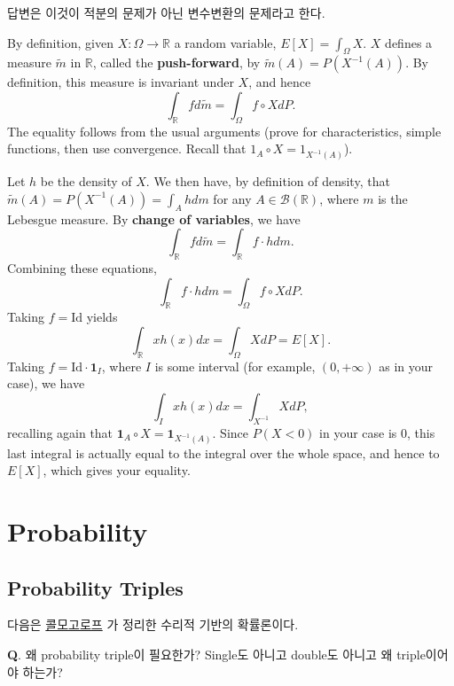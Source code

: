 \documentclass[
  13pt,
  letterpaper,
  DIV=11,
  numbers=noendperiod]{scrreprt}
\theoremstyle{plain}
\theoremstyle{definition}
\theoremstyle{definition}
\theoremstyle{plain}
\theoremstyle{definition}
\theoremstyle{plain}
\theoremstyle{remark}
\begin{document}
답변은 이것이 적분의 문제가 아닌 변수변환의 문제라고 한다.

By definition, given \(X: \Omega \rightarrow \mathbb{R}\) a random
variable, \(E[X] = \int_{\Omega} X\). \(X\) defines a measure
\(\tilde{m}\) in \(\mathbb{R}\), called the \textbf{push-forward}, by
\(\tilde{m}(A) = P(X^{-1}(A))\). By definition, this measure is
invariant under \(X\), and hence \[
\int_{\mathbb{R}} f d\tilde{m} = \int_{\Omega} f \circ X dP.
\] The equality follows from the usual arguments (prove for
characteristics, simple functions, then use convergence. Recall that
\(1_A \circ X = 1_{X^{-1}(A)}\)).

Let \(h\) be the density of \(X\). We then have, by definition of
density, that \(\tilde{m}(A) = P(X^{-1}(A)) = \int_A h dm\) for any
\(A \in \mathcal{B}(\mathbb{R})\), where \(m\) is the Lebesgue measure.
By \textbf{change of variables}, we have \[
\int_{\mathbb{R}}f d\tilde{m} = \int_{\mathbb{R}} f\cdot h dm.
\] Combining these equations, \[
\int_{\mathbb{R}} f \cdot h dm =\int_{\Omega} f \circ X dP.
\] Taking \(f=\text{Id}\) yields \[
\int_{\mathbb{R}}xh(x)dx = \int_{\Omega} X dP = E[X].
\] Taking \(f = \text{Id} \cdot \mathbf{1}_{I}\), where \(I\) is some
interval (for example, \((0, +\infty)\) as in your case), we have \[
\int_{I}xh(x)dx = \int_{X^{-1}}XdP,
\] recalling again that
\(\mathbf{1}_A \circ X = \mathbf{1}_{X^{-1}(A)}\). Since \(P(X<0)\) in
your case is \(0\), this last integral is actually equal to the integral
over the whole space, and hence to \(E[X]\), which gives your equality.

\chapter{Probability}\label{sec-prob}

\section{Probability Triples}\label{probability-triples}

다음은
\href{https://en.wikipedia.org/wiki/Andrey_Kolmogorov}{콜모고로프} 가
정리한 수리적 기반의 확률론이다.

\textbf{Q}. 왜 probability triple이 필요한가? Single도 아니고 double도
아니고 왜 triple이어야 하는가?
\end{document}
